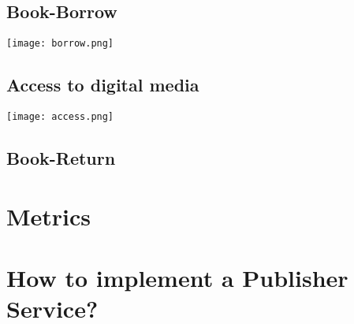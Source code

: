 \subsection{Book-Borrow}
\vspace{0.3cm}
\texttt{[image: borrow.png]}


\subsection{Access to digital media}
\vspace{0.3cm}
\texttt{[image: access.png]}


\subsection{Book-Return}

\section{Metrics}

\section{How to implement a Publisher Service?}

